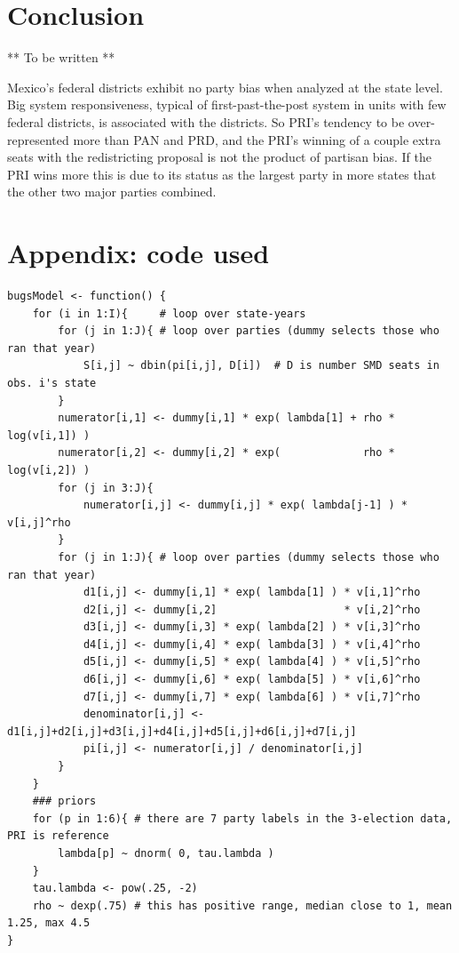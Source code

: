 \documentclass[letter,12pt]{article}
\begin{document}


\section{Conclusion}

** To be written **

Mexico's federal districts exhibit no party bias when analyzed at the state level. Big system responsiveness, typical of first-past-the-post system in units with few federal districts, is associated with the districts. So PRI's tendency to be over-represented more than PAN and PRD, and the PRI's winning of a couple extra seats with the redistricting proposal is not the product of partisan bias. If the PRI wins more this is due to its status as the largest party in more states that the other two major parties combined. 

\section*{Appendix: code used}

\begin{footnotesize}
\begin{verbatim}
bugsModel <- function() {
    for (i in 1:I){     # loop over state-years
        for (j in 1:J){ # loop over parties (dummy selects those who ran that year) 
            S[i,j] ~ dbin(pi[i,j], D[i])  # D is number SMD seats in obs. i's state
        }
        numerator[i,1] <- dummy[i,1] * exp( lambda[1] + rho * log(v[i,1]) )
        numerator[i,2] <- dummy[i,2] * exp(             rho * log(v[i,2]) )
        for (j in 3:J){
            numerator[i,j] <- dummy[i,j] * exp( lambda[j-1] ) * v[i,j]^rho
        }
        for (j in 1:J){ # loop over parties (dummy selects those who ran that year) 
            d1[i,j] <- dummy[i,1] * exp( lambda[1] ) * v[i,1]^rho 
            d2[i,j] <- dummy[i,2]                    * v[i,2]^rho 
            d3[i,j] <- dummy[i,3] * exp( lambda[2] ) * v[i,3]^rho 
            d4[i,j] <- dummy[i,4] * exp( lambda[3] ) * v[i,4]^rho 
            d5[i,j] <- dummy[i,5] * exp( lambda[4] ) * v[i,5]^rho 
            d6[i,j] <- dummy[i,6] * exp( lambda[5] ) * v[i,6]^rho 
            d7[i,j] <- dummy[i,7] * exp( lambda[6] ) * v[i,7]^rho 
            denominator[i,j] <- d1[i,j]+d2[i,j]+d3[i,j]+d4[i,j]+d5[i,j]+d6[i,j]+d7[i,j]
            pi[i,j] <- numerator[i,j] / denominator[i,j]
        }
    }
    ### priors
    for (p in 1:6){ # there are 7 party labels in the 3-election data, PRI is reference
        lambda[p] ~ dnorm( 0, tau.lambda )
    }
    tau.lambda <- pow(.25, -2)
    rho ~ dexp(.75) # this has positive range, median close to 1, mean 1.25, max 4.5
}
\end{verbatim}
\end{footnotesize}


%


\end{document}
